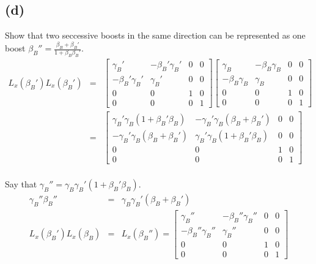 \documentclass[11pt]{amsart}
\begin{document}
\subsection*{(d)} Show that two seccessive boosts in the same direction can be represented as one boost $\beta_{B}''=\frac{\beta_{B}+\beta_{B}'}{1+\beta_{B}\beta_{B}'}$. \\
\begin{eqnarray*}
L_{x}(\beta_{B}')L_{x}(\beta_{B}') &=& \begin{bmatrix}
	\gamma_{B}' & -\beta_{B}'\gamma_{B}' & 0 & 0 \\
	-\beta_{B}'\gamma_{B}' & \gamma_{B}' & 0 & 0 \\
	0 & 0 & 1 & 0 \\
	0 & 0 & 0 & 1 
	\end{bmatrix}\begin{bmatrix}
	\gamma_{B} & -\beta_{B}\gamma_{B} & 0 & 0 \\
	-\beta_{B}\gamma_{B} & \gamma_{B} & 0 & 0 \\
	0 & 0 & 1 & 0 \\
	0 & 0 & 0 & 1 
	\end{bmatrix} \\
&=& \begin{bmatrix}
	\gamma_{B}'\gamma_{B}(1+\beta_{B}'\beta_{B}) & -\gamma_{B}'\gamma_{B}(\beta_{B}+\beta_{B}') & 0 & 0 \\
	 -\gamma_{B}'\gamma_{B}(\beta_{B}+\beta_{B}') & \gamma_{B}'\gamma_{B}(1+\beta_{B}'\beta_{B}) & 0 & 0 \\
	0 & 0 & 1 & 0 \\
	0 & 0 & 0 & 1 
	\end{bmatrix} 
\end{eqnarray*} \\
Say that $\gamma_{B}''=\gamma_{B}\gamma_{B}'(1+\beta_{B}'\beta_{B})$. \\
\begin{eqnarray*} 
\gamma_{B}''\beta_{B}'' &=& \gamma_{B}\gamma_{B}'(\beta_{B}+\beta_{B}') \\
L_{x}(\beta_{B}')L_{x}(\beta_{B}) &=& L_{x}(\beta_{B}'') = \begin{bmatrix}
	\gamma_{B}'' & -\beta_{B}''\gamma_{B}'' & 0 & 0 \\
	-\beta_{B}''\gamma_{B}'' & \gamma_{B}'' & 0 & 0 \\
	0 & 0 & 1 & 0 \\
	0 & 0 & 0 & 1
	\end{bmatrix} 
\end{eqnarray*} \\
\end{document}
